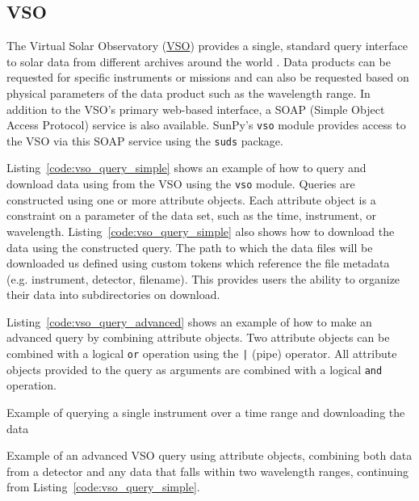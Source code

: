 \subsection{VSO}\label{ssec:vso}

The Virtual Solar Observatory (\href{http://virtualsolar.org}{VSO}) provides a 
single, standard query interface to solar data from different archives 
around the world \citep{hill2009}.
Data products can be requested for specific instruments or missions and
can also be requested based on physical parameters of the data product such
as the wavelength range.
In addition to the VSO's primary web-based interface, a SOAP (Simple Object 
Access Protocol) service is also available.
SunPy's \texttt{vso} module provides access to the VSO via this SOAP service using the
\texttt{suds} package.

Listing~\ref{code:vso_query_simple} shows an example of how to query and download data using
from the VSO using the \texttt{vso} module.
Queries are constructed using one or more attribute objects. Each
attribute object is a constraint on a parameter of the data set, such as the
time, instrument, or wavelength.
Listing~\ref{code:vso_query_simple} also shows how to download the data using
the constructed query. The path to which the data files will be downloaded us defined using custom tokens
which reference the file metadata (e.g. instrument, detector, filename). This provides
users the ability to organize their data into subdirectories on download.

Listing~\ref{code:vso_query_advanced} shows an example of how to make an advanced
query by combining attribute objects.
Two attribute objects can be combined with a logical \texttt{or} operation
using the \texttt{|} (pipe) operator.
All attribute objects provided to the query as arguments are combined with a 
logical \texttt{and} operation.

\begin{listing}[H]
\caption{Example of querying a single instrument over a time range and downloading the data}
\label{code:vso_query_simple}
\end{listing}

\begin{listing}[H]
\caption{Example of an advanced VSO query using attribute objects,
combining both data from a detector and any data that falls within two wavelength ranges,
continuing from Listing~\ref{code:vso_query_simple}.}
\label{code:vso_query_advanced}
\end{listing}
